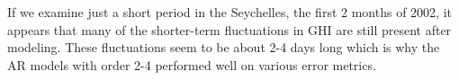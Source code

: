 \documentclass[
  letterpaper,
  DIV=11,
  numbers=noendperiod]{scrartcl}
\begin{document}
If we examine just a short period in the Seychelles, the first 2 months
of 2002, it appears that many of the shorter-term fluctuations in GHI
are still present after modeling. These fluctuations seem to be about
2-4 days long which is why the AR models with order 2-4 performed well
on various error metrics.

\begin{figure}

\begin{minipage}[t]{0.50\linewidth}

{\centering 


}

\end{minipage}%
%
\begin{minipage}[t]{0.50\linewidth}

{\centering 


}

\end{minipage}%

\end{figure}
\end{document}
